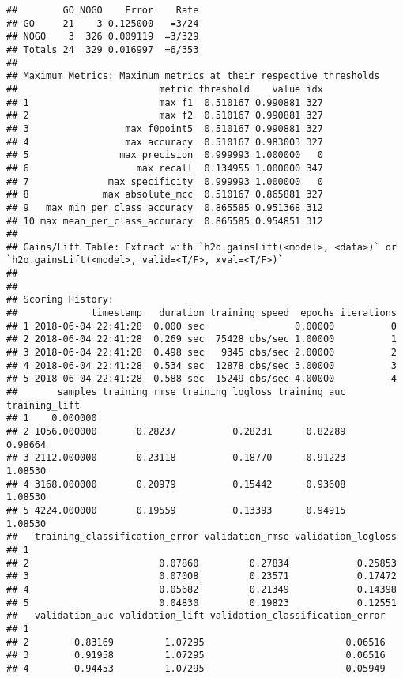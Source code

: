\documentclass[]{article}
\begin{document}
\begin{verbatim}
##        GO NOGO    Error    Rate
## GO     21    3 0.125000   =3/24
## NOGO    3  326 0.009119  =3/329
## Totals 24  329 0.016997  =6/353
## 
## Maximum Metrics: Maximum metrics at their respective thresholds
##                         metric threshold    value idx
## 1                       max f1  0.510167 0.990881 327
## 2                       max f2  0.510167 0.990881 327
## 3                 max f0point5  0.510167 0.990881 327
## 4                 max accuracy  0.510167 0.983003 327
## 5                max precision  0.999993 1.000000   0
## 6                   max recall  0.134955 1.000000 347
## 7              max specificity  0.999993 1.000000   0
## 8             max absolute_mcc  0.510167 0.865881 327
## 9   max min_per_class_accuracy  0.865585 0.951368 312
## 10 max mean_per_class_accuracy  0.865585 0.954851 312
## 
## Gains/Lift Table: Extract with `h2o.gainsLift(<model>, <data>)` or `h2o.gainsLift(<model>, valid=<T/F>, xval=<T/F>)`
## 
## 
## Scoring History: 
##             timestamp   duration training_speed  epochs iterations
## 1 2018-06-04 22:41:28  0.000 sec                0.00000          0
## 2 2018-06-04 22:41:28  0.269 sec  75428 obs/sec 1.00000          1
## 3 2018-06-04 22:41:28  0.498 sec   9345 obs/sec 2.00000          2
## 4 2018-06-04 22:41:28  0.534 sec  12878 obs/sec 3.00000          3
## 5 2018-06-04 22:41:28  0.588 sec  15249 obs/sec 4.00000          4
##       samples training_rmse training_logloss training_auc training_lift
## 1    0.000000                                                          
## 2 1056.000000       0.28237          0.28231      0.82289       0.98664
## 3 2112.000000       0.23118          0.18770      0.91223       1.08530
## 4 3168.000000       0.20979          0.15442      0.93608       1.08530
## 5 4224.000000       0.19559          0.13393      0.94915       1.08530
##   training_classification_error validation_rmse validation_logloss
## 1                                                                 
## 2                       0.07860         0.27834            0.25853
## 3                       0.07008         0.23571            0.17472
## 4                       0.05682         0.21349            0.14398
## 5                       0.04830         0.19823            0.12551
##   validation_auc validation_lift validation_classification_error
## 1                                                               
## 2        0.83169         1.07295                         0.06516
## 3        0.91958         1.07295                         0.06516
## 4        0.94453         1.07295                         0.05949

\end{verbatim}
\end{document}
